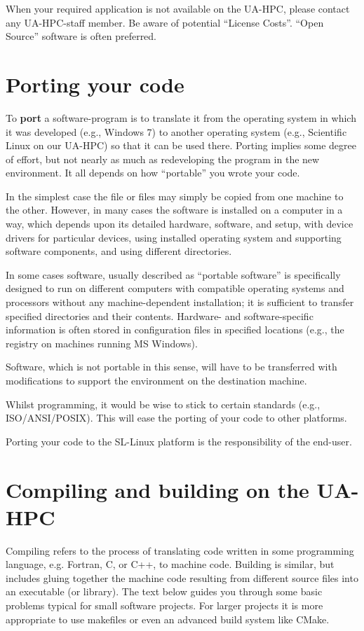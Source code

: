When your required application is not available on the UA-HPC, please contact any UA-HPC-staff member. Be aware of potential ``License Costs''.  ``Open Source'' software is often preferred.

\section{Porting your code}

To \textbf{port} a software-program is to translate it from the operating system in which it was developed (e.g., Windows 7) to another operating system (e.g., Scientific Linux on our UA-HPC) so that it can be used there. Porting implies some degree of effort, but not nearly as much as redeveloping the program in the new environment.  It all depends on how ``portable'' you wrote your code.

In the simplest case the file or files may simply be copied from one machine to the other. However, in many cases the software is installed on a computer in a way, which depends upon its detailed hardware, software, and setup, with device drivers for particular devices, using installed operating system and supporting software components, and using different directories.

In some cases software, usually described as ``portable software'' is specifically designed to run on different computers with compatible operating systems and processors without any machine-dependent installation; it is sufficient to transfer specified directories and their contents. Hardware- and software-specific information is often stored in configuration files in specified locations (e.g., the registry on machines running MS Windows).

Software, which is not portable in this sense, will have to be transferred with modifications to support the environment on the destination machine.

Whilst programming, it would be wise to stick to certain standards (e.g., ISO/ANSI/POSIX).  This will ease the porting of your code to other platforms.

Porting your code to the SL-Linux platform is the responsibility of the end-user.

\section{Compiling and building on the UA-HPC}

Compiling refers to the process of translating code written in some programming language, e.g. Fortran, C, or C++, to machine code. Building is similar, but includes gluing together the machine code resulting from different source files into an executable (or library). The text below guides you through some basic problems typical for small software projects. For larger projects it is more appropriate to use makefiles or even an advanced build system like CMake.

